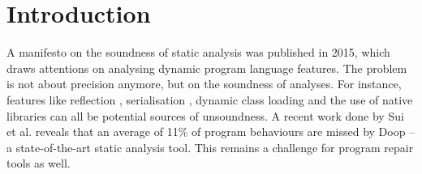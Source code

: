 \documentclass[sigconf,review,anonymous]{acmart}
\begin{document}




\maketitle

\section{Introduction}
A manifesto on the soundness of static analysis \cite{livshits2015defense} was published in 2015, which draws attentions on analysing dynamic program language features. The problem is not about precision anymore, but on the soundness of analyses. For instance, features like reflection , serialisation , dynamic class loading and the use of native libraries can all be potential sources of unsoundness.
A recent work done by Sui et al. \cite{sui2020recall} reveals that an average of 11\% of program behaviours are missed by Doop \cite{bravenboer2009strictly} -- a state-of-the-art static analysis tool. This remains a challenge for program repair tools as well. %
\end{document}
